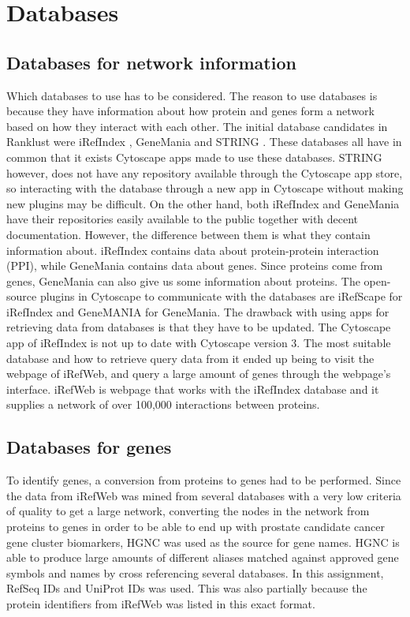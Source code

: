 \chapter{Databases}
\section{Databases for network information}
Which databases to use has to be considered. The reason to use databases is
because they have information about how protein and genes form a network based
on how they interact with each other. The initial database candidates in
Ranklust were iRefIndex \cite{iri}, GeneMania \cite{gm} and STRING \cite{str}.
These databases all have in common that it exists Cytoscape apps made to use
these databases. STRING however, does not have any repository available through
the Cytoscape app store, so interacting with the database through a new app in
Cytoscape without making new plugins may be difficult. On the other hand, both
iRefIndex and GeneMania have their repositories easily available to the public
together with decent documentation. However, the difference between them is what
they contain information about. iRefIndex contains data about protein-protein
interaction (PPI), while GeneMania contains data about genes. Since proteins
come from genes, GeneMania can also give us some information about proteins. The
open-source plugins in Cytoscape to communicate with the databases are iRefScape
\cite{iridb} for iRefIndex and GeneMANIA \cite{gmdb} for GeneMania. The drawback
with using apps for retrieving data from databases is that they have to be
updated. The Cytoscape app of iRefIndex\cite{iridb} is not up to date with
Cytoscape version 3. The most suitable database and how to retrieve query data
from it ended up being to visit the webpage of iRefWeb, and query a large amount
of genes through the webpage's interface\cite{irefweb}. iRefWeb is webpage that
works with the iRefIndex database and it supplies a network of over 100,000
interactions between proteins.

\section{Databases for genes}
To identify genes, a conversion from proteins to genes had to be performed.
Since the data from iRefWeb was mined from several databases with a very low
criteria of quality to get a large network, converting the nodes in the network
from proteins to genes in order to be able to end up with prostate candidate
cancer gene cluster biomarkers, HGNC\cite{hgnc-site} was used as the source for
gene names. HGNC is able to produce large amounts of different aliases matched
against approved gene symbols and names by cross referencing several databases.
In this assignment, RefSeq IDs and UniProt IDs was used. This was also partially
because the protein identifiers from iRefWeb was listed in this exact format.

